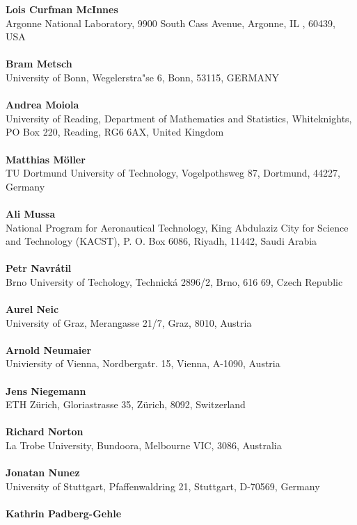 \textbf{Lois Curfman McInnes}
\\ 
Argonne National Laboratory, 9900 South Cass Avenue, Argonne, IL , 60439, USA\\ 
\\ 
\textbf{Bram Metsch}
\\ 
University of Bonn, Wegelerstra"se 6, Bonn, 53115, GERMANY\\ 
\\ 
\textbf{Andrea Moiola}
\\ 
University of Reading, Department of Mathematics and Statistics, Whiteknights, PO Box 220, Reading, RG6 6AX, United Kingdom\\ 
\\ 
\textbf{Matthias M\"oller}
\\ 
TU Dortmund University of Technology, Vogelpothsweg 87, Dortmund, 44227, Germany\\ 
\\ 
\textbf{Ali Mussa}
\\ 
National Program for Aeronautical Technology, King Abdulaziz City for Science and Technology (KACST), P. O. Box 6086, Riyadh, 11442, Saudi Arabia\\ 
\\ 
\textbf{Petr Navr\'atil}
\\ 
Brno University of Techology, Technick\'a 2896/2, Brno, 616 69, Czech Republic\\ 
\\ 
\textbf{Aurel Neic}
\\ 
University of Graz, Merangasse 21/7, Graz, 8010, Austria\\ 
\\ 
\textbf{Arnold Neumaier}
\\ 
Univiersity of Vienna, Nordbergatr. 15, Vienna, A-1090, Austria\\ 
\\ 
\textbf{Jens Niegemann}
\\ 
ETH Z\"urich, Gloriastrasse 35, Z\"urich, 8092, Switzerland\\ 
\\ 
\textbf{Richard Norton}
\\ 
La Trobe University, Bundoora, Melbourne VIC, 3086, Australia\\ 
\\ 
\textbf{Jonatan Nunez}
\\ 
University of Stuttgart, Pfaffenwaldring 21, Stuttgart, D-70569, Germany\\ 
\\ 
\textbf{Kathrin Padberg-Gehle}
